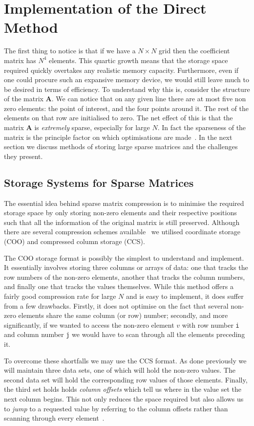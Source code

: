 \documentclass[a4paper]{article}
\newcommand{\mat}[1]{\mathbf{#1}}
\begin{document}
\section{Implementation of the Direct Method}
The first thing to notice is that if we have a $N\times N$ grid then the
coefficient matrix has $N^4$ elements. This quartic growth means that the
storage space required quickly overtakes any realistic memory capacity.
Furthermore, even if one could procure such an expansive memory device, we
would still leave much to be desired in terms of efficiency. To understand why
this is, consider the structure of the matrix $\mat{A}$. We can notice that on
any given line there are at most five non zero elements: the point of interest,
and the four points around it. The rest of the elements on that row are
initialised to zero. The net effect of this is that the matrix $\mat{A}$ is
\emph{extremely} sparse, especially for large $N$. In fact the sparseness of
the matrix is the principle factor on which optimisations are made~\cite{NR}.
In the next section we discuss methods of storing large sparse matrices and the
challenges they present.

\subsection{Storage Systems for Sparse Matrices}
The essential idea behind sparse matrix compression is to minimise the required
storage space by only storing non-zero elements and their respective positions
such that all the information of the original matrix is still preserved.
Although there are several compression schemes available~\cite{101matstore} we
utilised coordinate storage (COO) and compressed column storage (CCS).

The COO storage format is possibly the simplest to understand and implement. It
essentially involves storing three columns or arrays of data: one that tracks
the row numbers of the non-zero elements, another that tracks the column
numbers, and finally one that tracks the values themselves. While this method
offers a fairly good compression rate for large $N$ and is easy to implement,
it does suffer from a few drawbacks. Firstly, it does not optimise on the fact
that several non-zero elements share the same column (or row) number; secondly,
and more significantly, if we wanted to access the non-zero element $v$ with
row number \texttt{i} and column number \texttt{j} we would have to scan
through all the elements preceding it.

To overcome these shortfalls we may use the CCS format. As done previously we
will maintain three data sets, one of which will hold the non-zero values. The
second data set will hold the corresponding row values of those elements.
Finally, the third set holds holds \emph{column offsets} which tell us where in
the value set the next column begins. This not only reduces the space required
but also allows us to \emph{jump} to a requested value by referring to the
column offsets rather than scanning through every element~\cite{101matstore}.
\end{document}
